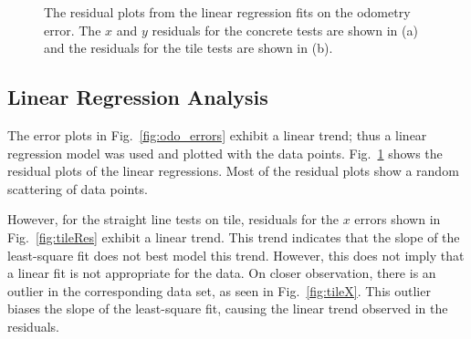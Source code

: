 \documentclass[conference]{../IEEEtran}
\begin{document}
\begin{figure}[t]
  \centering
  \caption{The residual plots from the linear regression fits on the odometry error.
           The $x$ and $y$ residuals for the concrete tests are shown in (a) and the
           residuals for the tile tests are shown in (b).}
  \label{fig:residuals}
\end{figure}

\subsection{Linear Regression Analysis}
The error plots in Fig.~\ref{fig:odo_errors} exhibit a linear trend; thus a linear
regression model was used and plotted with the data points. Fig.~\ref{fig:residuals} shows
the residual plots of the linear regressions. Most of the residual plots show a random
scattering of data points.

However, for the straight line tests on tile, residuals for the $x$ errors shown in
Fig.~\ref{fig:tileRes} exhibit a linear trend. This trend indicates that the slope of the
least-square fit does not best model this trend. However, this does not imply that a
linear fit is not appropriate for the data.  On closer observation, there is an outlier in
the corresponding data set, as seen in Fig.~\ref{fig:tileX}. This outlier biases the slope
of the least-square fit, causing the linear trend observed in the residuals.
\end{document}
